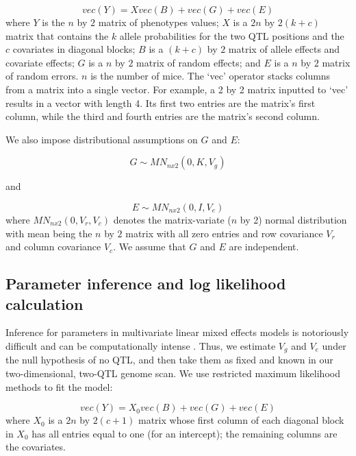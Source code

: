 \documentclass[oneside]{book}\usepackage[]{graphicx}\usepackage[]{color}
\begin{document}
\begin{equation}
vec(Y) = X vec(B) + vec(G) + vec(E)
\label{eqn:model1}
\end{equation}
where $Y$ is the $n$ by $2$ matrix of phenotypes values;
$X$ is a $2n$ by $2(k + c)$
matrix that contains the $k$ allele probabilities for the two QTL
positions and the $c$
covariates in diagonal blocks; $B$ is a $(k + c)$ by $2$ matrix of
allele effects and covariate effects; $G$ is a $n$ by $2$ matrix of
random effects; and $E$ is a $n$ by $2$ matrix of random errors. $n$
is the number of mice. The `vec' operator stacks columns from a matrix
into a single vector. For example, a 2 by 2 matrix inputted to `vec'
results in a vector with length 4. Its first two entries are the
matrix's first column, while the third and fourth entries are the
matrix's second column.


We also impose distributional assumptions on $G$ and $E$:

\begin{equation}
G \sim MN_{n x 2}(0, K, V_g)
\label{eqn:model2}
\end{equation}

and

\begin{equation}
E \sim MN_{nx2}(0, I, V_e)
\label{eqn:model3}
\end{equation}
where $MN_{n x 2}(0, V_r, V_c)$ denotes the matrix-variate ($n$ by 2)
normal distribution with mean being the $n$ by $2$ matrix with all
zero entries and row covariance $V_r$ and column covariance $V_c$. We
assume that $G$ and $E$ are independent.


\subsection{Parameter inference and log likelihood calculation}

Inference for parameters in multivariate linear mixed effects models
is notoriously difficult and can be computationally intense
\citep{meyer1989restricted,meyer1991estimating}. Thus, we estimate
$V_g$ and $V_e$ under the null hypothesis of no QTL, and then take
them as fixed and known in our two-dimensional, two-QTL genome scan.
We use restricted maximum likelihood methods to fit the
model:

\begin{equation}
vec(Y) = X_0vec(B) + vec(G) + vec(E)
\label{model}
\end{equation}
where $X_0$ is a $2n$ by $2(c + 1)$ matrix whose first column of each
diagonal block in $X_0$ has all entries equal to one (for an intercept); the remaining
columns are the covariates.
\end{document}
